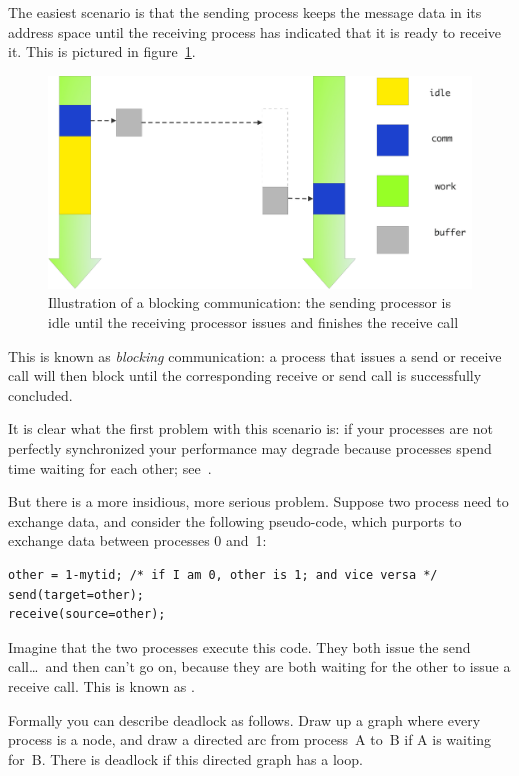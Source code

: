 The easiest scenario is that the sending process keeps the message
data in its address space until the receiving process has indicated
that it is ready to receive it. This is pictured in
figure~\ref{fig:send-blocking}.
\begin{figure}[ht]
\includegraphics[scale=.1]{graphics-public/send-blocking}
\caption{Illustration of a blocking communication: the sending processor is idle until the receiving processor issues and finishes the receive call}
\label{fig:send-blocking}
\end{figure}
This is known as \emph{blocking} communication: a process that issues
a send or receive call will then block until the corresponding receive
or send call is successfully concluded.

It is clear what the first problem with this scenario is: if your
processes are not perfectly synchronized your performance may degrade
because processes spend time waiting for each other;
see~. 

But there is a more insidious, more serious problem.
Suppose two process need to exchange data, and consider the following
pseudo-code, which purports to exchange data between processes 0 and~1:
\begin{verbatim}
other = 1-mytid; /* if I am 0, other is 1; and vice versa */
send(target=other);
receive(source=other);
\end{verbatim}
Imagine that the two processes execute this code. They both issue the
send call\ldots\ and then can't go on, because they are both waiting
for the other to issue a receive call. This is known
as .

Formally you can describe deadlock as follows. Draw up a graph where
every process is a node, and draw a directed arc from process~A to~B if
A is waiting for~B. There is deadlock if this directed graph has a
loop.

